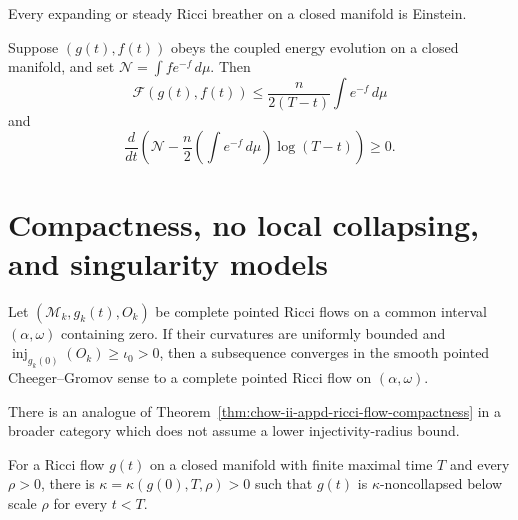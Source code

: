 \begin{lemma}
\label{lem:chow-ii-appd-no-expanding-breathers}
Every expanding or steady Ricci breather on a closed manifold is Einstein.
\end{lemma}

\begin{lemma}
\label{lem:chow-ii-appd-classical-entropy-monotonicity}
Suppose $(g(t),f(t))$ obeys the coupled energy evolution on a closed manifold,
and set $\mathcal N=\int f e^{-f}\,d\mu$. Then
\[
 \mathcal F(g(t),f(t))\leq\frac n{2(T-t)}\int e^{-f}\,d\mu
\]
and
\[
 \frac d{dt}\left(\mathcal N-
 \frac n2\left(\int e^{-f}\,d\mu\right)\log(T-t)\right)\geq0.
\]
\end{lemma}

\section{Compactness, no local collapsing, and singularity models}

\begin{theorem}
\label{thm:chow-ii-appd-ricci-flow-compactness}
Let $(\mathcal M_k,g_k(t),O_k)$ be complete pointed Ricci flows on a common
interval $(\alpha,\omega)$ containing zero. If their curvatures are uniformly
bounded and $\operatorname{inj}_{g_k(0)}(O_k)\geq\iota_0>0$, then a subsequence
converges in the smooth pointed Cheeger--Gromov sense to a complete pointed
Ricci flow on $(\alpha,\omega)$.
\end{theorem}

\begin{remark}
\label{rem:chow-ii-appd-compactness-without-injectivity}
There is an analogue of Theorem~\ref{thm:chow-ii-appd-ricci-flow-compactness}
in a broader category which does not assume a lower injectivity-radius bound.
\end{remark}

\begin{theorem}
\label{thm:chow-ii-appd-no-local-collapsing}
For a Ricci flow $g(t)$ on a closed manifold with finite maximal time $T$ and
every $\rho>0$, there is $\kappa=\kappa(g(0),T,\rho)>0$ such that $g(t)$ is
$\kappa$-noncollapsed below scale $\rho$ for every $t<T$.
\end{theorem}

